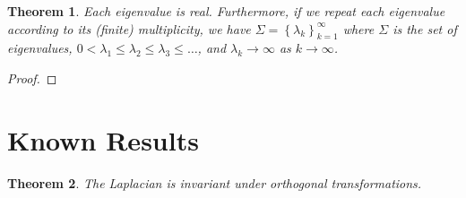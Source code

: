\documentclass[12pt]{report}
\newtheorem{theorem}{Theorem}[section]
\numberwithin{definition}{section}
\begin{document}
\begin{theorem}
  Each eigenvalue is real.
  Furthermore, if we repeat each eigenvalue according to its (finite) multiplicity, we have
    $\Sigma = \left\{ \lambda_{k} \right\}_{k=1}^\infty$ 
    where $\Sigma$ is the set of eigenvalues, 
    $0 < \lambda_1 \leq \lambda_2 \leq \lambda_3 \leq \ldots$,
    and $\lambda_{k} \to \infty$ as $k \to \infty$.
    
\end{theorem}

\begin{proof}
\end{proof}

\break

\section{Known Results}


\begin{theorem}
  The Laplacian is invariant under orthogonal transformations.
\end{theorem}
\end{document}
